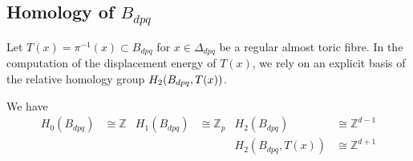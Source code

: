 \documentclass[12pt,a4paper,draft]{scrartcl}
\begin{document}
\subsection{Homology of \texorpdfstring{$B_{dpq}$}{Bdpq}}
\label{sec:homology}

Let $T(x) = π^{-1}(x) \subset B_{dpq}$ for $x ∈ Δ_{dpq}$ be a regular almost toric fibre. In the computation of the displacement energy of $T(x)$, we rely on an explicit basis of the relative homology group $H_2\qty(B_{dpq},T(x))$.

\begin{lemma}
  \label{thm:homology}
  We have
  \begin{align*}
    H_0(B_{dpq}) &≅ ℤ & H_1(B_{dpq}) &≅ ℤ_p & H_2(B_{dpq}) &≅ ℤ^{d-1} \\
                 &    &              &      & H_2(B_{dpq},T(x)) &≅ ℤ^{d+1}
  \end{align*}
\end{lemma}
\end{document}
